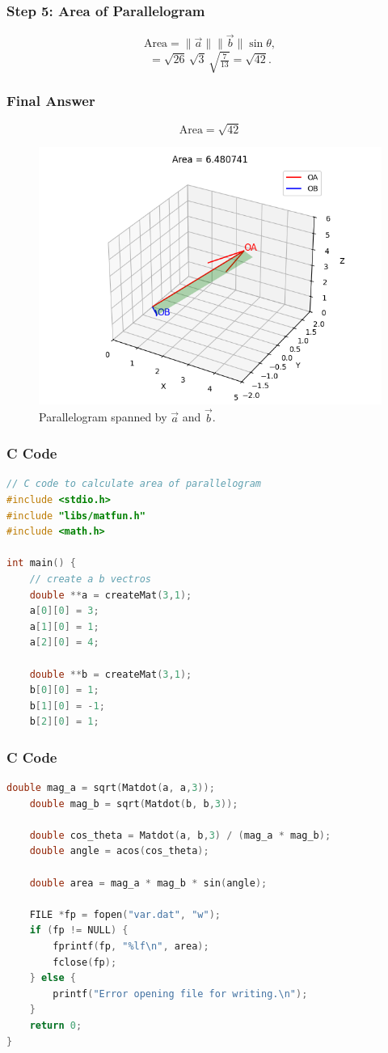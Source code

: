 \documentclass{beamer}
\begin{document}
\begin{frame}
\frametitle{Step 5: Area of Parallelogram}
\begin{equation}
\text{Area} = \|\Vec{a}\| \|\Vec{b}\| \sin\theta,
\end{equation}
\begin{equation}
= \sqrt{26}\,\sqrt{3}\,\sqrt{\tfrac{7}{13}}
= \sqrt{42}.
\end{equation}
\end{frame}

\begin{frame}
\frametitle{Final Answer}
\begin{equation}
\boxed{\text{Area} = \sqrt{42}}
\end{equation}
\begin{figure}[h!]
    \centering
    \includegraphics[width=0.6\linewidth]{figs/fig.png}
    \caption{Parallelogram spanned by $\Vec{a}$ and $\Vec{b}$.}
\end{figure}
\end{frame}

\begin{frame}[fragile]
    \frametitle{C Code}
    \begin{lstlisting}[language=C]
// C code to calculate area of parallelogram
#include <stdio.h>
#include "libs/matfun.h"
#include <math.h>

int main() {
    // create a b vectros 
    double **a = createMat(3,1);
    a[0][0] = 3;
    a[1][0] = 1;
    a[2][0] = 4;

    double **b = createMat(3,1);
    b[0][0] = 1;
    b[1][0] = -1;
    b[2][0] = 1;

\end{lstlisting}
\end{frame}

\begin{frame}[fragile]
    \frametitle{C Code}
    \begin{lstlisting}[language=C]
    double mag_a = sqrt(Matdot(a, a,3));
    double mag_b = sqrt(Matdot(b, b,3));

    double cos_theta = Matdot(a, b,3) / (mag_a * mag_b);
    double angle = acos(cos_theta);

    double area = mag_a * mag_b * sin(angle);

    FILE *fp = fopen("var.dat", "w");
    if (fp != NULL) {
        fprintf(fp, "%lf\n", area);
        fclose(fp);
    } else {
        printf("Error opening file for writing.\n");
    }
    return 0;
}

\end{lstlisting}
\end{frame}
\end{document}
